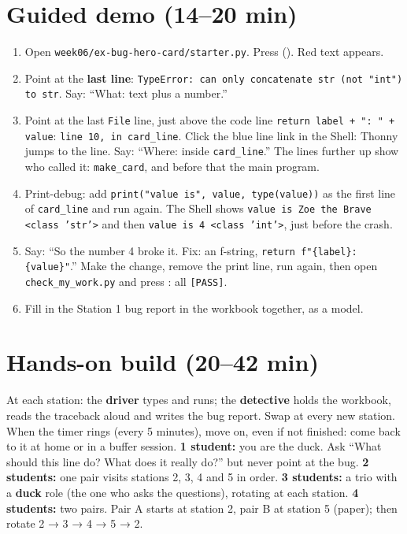 \section{Guided demo (14--20 min)}
\begin{workedexample}
\begin{enumerate}[leftmargin=1.4em]
  \item Open \texttt{week06/ex-bug-hero-card/starter.py}. Press  (). Red text appears.
  \item Point at the \textbf{last line}: \texttt{TypeError: can only concatenate str (not "int") to str}. Say: \enquote{What: text plus a number.}
  \item Point at the last \texttt{File} line, just above the code line \texttt{return label + ": " + value}: \texttt{line 10, in card\_line}. Click the blue line link in the Shell: Thonny jumps to the line. Say: \enquote{Where: inside \texttt{card\_line}.}
        The lines further up show who called it: \texttt{make\_card}, and before that the main program.
  \item Print-debug: add \texttt{print("value is", value, type(value))} as the first line of \texttt{card\_line} and run again.
        The Shell shows \texttt{value is Zoe the Brave <class 'str'>} and then \texttt{value is 4 <class 'int'>}, just before the crash.
  \item Say: \enquote{So the number 4 broke it. Fix: an f-string, \texttt{return f"\{label\}: \{value\}"}.} Make the change, remove the print line, run again,
        then open \texttt{check\_my\_work.py} and press : all \texttt{[PASS]}.
  \item Fill in the Station 1 bug report in the workbook together, as a model.
\end{enumerate}
\end{workedexample}

\section{Hands-on build (20--42 min)}
\begin{pairroles}
At each station: the \textbf{driver} types and runs; the \textbf{detective} holds the workbook, reads the traceback aloud and writes the bug report.
Swap at every new station. When the timer rings (every 5 minutes), move on, even if not finished: come back to it at home or in a buffer session.
\textbf{1 student:} you are the duck. Ask \enquote{What should this line do? What does it really do?} but never point at the bug.
\textbf{2 students:} one pair visits stations 2, 3, 4 and 5 in order.
\textbf{3 students:} a trio with a \textbf{duck} role (the one who asks the questions), rotating at each station.
\textbf{4 students:} two pairs. Pair A starts at station 2, pair B at station 5 (paper); then rotate 2 → 3 → 4 → 5 → 2.
\end{pairroles}

